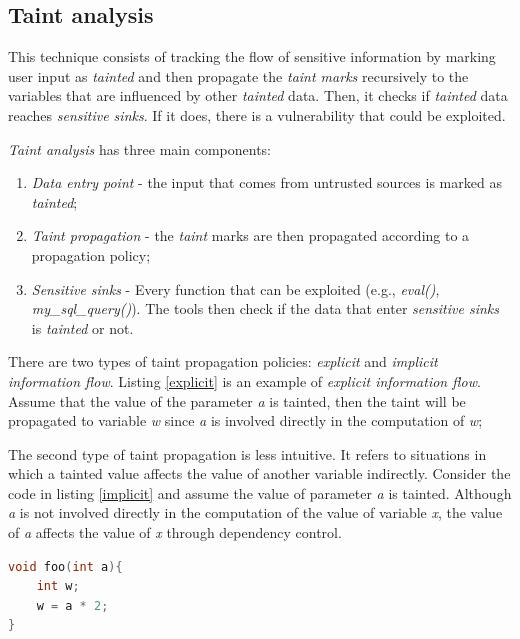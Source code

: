\subsection{Taint analysis}
\label{taintanalysis}

This technique consists of tracking the flow of sensitive information by marking user input as \textit{tainted} and then propagate the \textit{taint marks} recursively to the variables that are influenced by other \textit{tainted} data. Then, it checks if \textit{tainted} data reaches \textit{sensitive sinks}. If it does, there is a vulnerability that could be exploited.

\textit{Taint analysis} has three main components:
\begin{enumerate}
    \item \textit{Data entry point} - the input that comes from untrusted sources is marked as \textit{tainted};
    \item \textit{Taint propagation} - the \textit{taint} marks are then propagated according to a propagation policy;
    \item \textit{Sensitive sinks} - Every function that can be exploited (e.g., \textit{eval()},  \textit{my\_sql\_query()}). The tools then check if the data that enter \textit{sensitive sinks} is \textit{tainted}  or not.
\end{enumerate}

There are two types of taint propagation policies: \textit{explicit} and \textit{implicit information flow}.
Listing \ref{explicit} is an example of \textit{explicit information flow}. Assume that the value of the parameter \textit{a} is tainted, then the taint will be propagated to variable \textit{w} since \textit{a} is involved directly in the computation of \textit{w};

The second type of taint propagation is less intuitive. It refers to situations in which a tainted value affects the value of another variable indirectly. Consider the code in listing \ref{implicit} and assume the value of parameter \textit{a} is tainted. Although \textit{a} is not involved directly in the computation of the value of variable \textit{x}, the value of \textit{a} affects the value of \textit{x} through dependency control.


\begin{lstlisting}[language=C, caption={Explicit information flow},label=explicit,captionpos=b]
void foo(int a){  
    int w;
    w = a * 2;
}  
\end{lstlisting}

